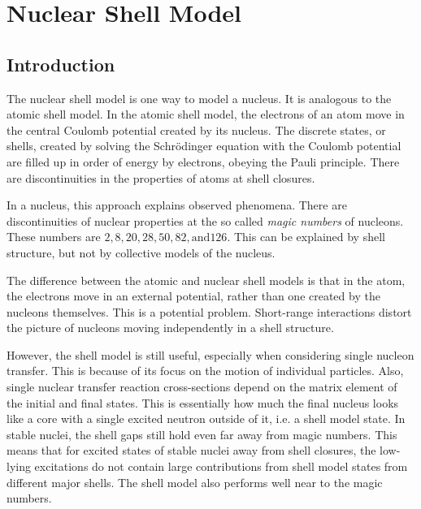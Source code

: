 
\chapter{Nuclear Shell Model} %

\label{Chapter 2} %


\section{Introduction}

The nuclear shell model is one way to model a nucleus. It is analogous to the atomic shell model. In the atomic shell model, the electrons of an atom move in the central Coulomb potential created by its nucleus. The discrete states, or shells, created by solving the Schr\"odinger equation with the Coulomb potential are filled up in order of energy by electrons, obeying the Pauli principle. There are discontinuities in the properties of atoms at shell closures\cite{atomicshell}.

In a nucleus, this approach explains observed phenomena. There are discontinuities of nuclear properties at the so called \textit{magic numbers} of nucleons\cite{mayer}. These numbers are $2, 8, 20, 28, 50, 82, \mathrm{and }126$\cite{krane}. This can be explained by shell structure, but not by collective models of the nucleus.

The difference between the atomic and nuclear shell models is that in the atom, the electrons move in an external potential, rather than one created by the nucleons themselves. This is a potential problem. Short-range interactions distort the picture of nucleons moving independently in a shell structure.

However, the shell model is still useful, especially when considering single nucleon transfer. This is because of its focus on the motion of individual particles. Also, single nuclear transfer reaction cross-sections depend on the matrix element of the initial and final states. This is essentially how much the final nucleus looks like a core with a single excited neutron outside of it, i.e. a shell model state. In stable nuclei, the shell gaps still hold even far away from magic numbers. This means that for excited states of stable nuclei away from shell closures, the low-lying excitations do not contain large contributions from shell model states from different major shells. The shell model also performs well near to the magic numbers\cite{shellmodelmagic}.

